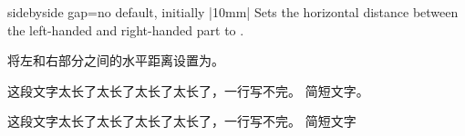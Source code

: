 \begin{docTcbKey}{sidebyside gap}{=}{no default, initially |10mm|}
Sets the horizontal distance between the left-handed and right-handed part to .

将左和右部分之间的水平距离设置为。

\begin{dispExample}

\begin{tcolorbox}[adjusted title=宽gap,sidebyside gap=30mm]
这段文字太长了太长了太长了太长了，一行写不完。
\tcblower
简短文字。
\end{tcolorbox}\hfill
\begin{tcolorbox}[adjusted title=窄gap,sidebyside gap=1mm]
这段文字太长了太长了太长了太长了，一行写不完。
\tcblower
简短文字
\end{tcolorbox}
\end{dispExample}
\end{docTcbKey}